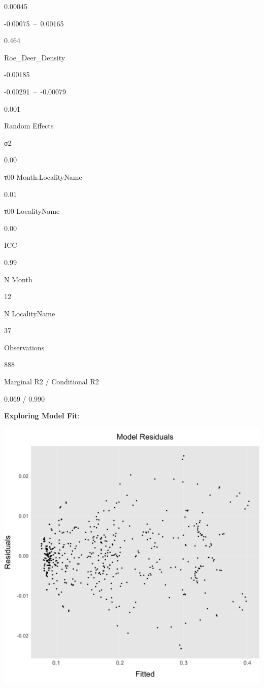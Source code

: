 \documentclass[]{article}
\begin{document}
0.00045

-0.00075~--~0.00165

0.464

Roe\_Deer\_Density

-0.00185

-0.00291~--~-0.00079

0.001

Random Effects

σ2

0.00

τ00 Month:LocalityName

0.01

τ00 LocalityName

0.00

ICC

0.99

N Month

12

N LocalityName

37

Observations

888

Marginal R2 / Conditional R2

0.069 / 0.990

\textbf{Exploring Model Fit}:

\begin{center}\includegraphics[width=0.8\linewidth]{../../../Approach_3/Output/Analysis/residuals_plot_approach_3} \end{center}
\end{document}
